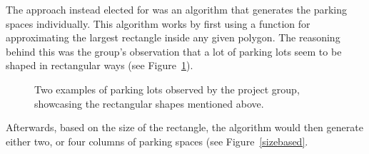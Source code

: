 The approach instead elected for was an algorithm that generates the parking spaces individually.
This algorithm works by first using a function for approximating the largest rectangle inside any given polygon. 
The reasoning behind this was the group's observation that a lot of parking lots seem to be shaped in rectangular ways (see Figure~\ref{fig:parkings}).
\begin{figure}[H]
  \centering
  \begin{subfigure}[b]{0.56\textwidth}
  \end{subfigure}
  \quad
  \begin{subfigure}[b]{0.395\textwidth}
  \end{subfigure}

  \caption{Two examples of parking lots observed by the project group, showcasing the rectangular shapes mentioned above.}
  \label{fig:parkings}
\end{figure}
Afterwards, based on the size of the rectangle, the algorithm would then generate either two, or four columns of parking spaces (see Figure~\ref{sizebased}.
